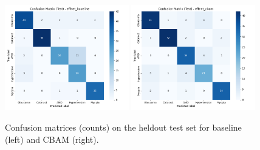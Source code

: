 \begin{figure}[t]
  \centering
  \includegraphics[width=0.48\textwidth]{../new_work/figures/cm_effnet_baseline_counts.png}
  \includegraphics[width=0.48\textwidth]{../new_work/figures/cm_effnet_cbam_counts.png}
  \caption{Confusion matrices (counts) on the held\textendash out test set for baseline (left) and CBAM (right).}
  \label{fig:cms}
\end{figure}

